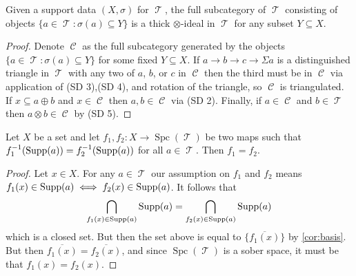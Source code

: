 \documentclass[11pt]{article}
\DeclareMathOperator{\CC}{\mathcal{C}}
\DeclareMathOperator{\TT}{\mathcal{T}}
\DeclareMathOperator{\spc}{Spc}
\begin{document}
\begin{lem}\label{lem:support-ideal}
Given a support data $(X,\sigma)$ for $\TT$, the full subcategory of $\TT$ consisting of objects $\{a \in \TT: \sigma(a) \subseteq Y\}$ is a thick $\otimes$-ideal in $\TT$ for any subset $Y \subseteq X$.
\end{lem}
\begin{proof}
Denote $\CC$ as the full subcategory generated by the objects $\{a \in \TT: \sigma(a) \subseteq Y\}$ for some fixed $Y \subseteq X$. If $a \xrightarrow{} b \xrightarrow{} c \xrightarrow{} \Sigma a $ is a distinguished triangle in $\TT$ with any two of $a$, $b$, or $c$ in $\CC$ then the third must be in $\CC$ via application of (SD 3),(SD 4), and rotation of the triangle, so $\CC$ is triangulated. If $x \subseteq a \oplus b$ and $x \in \CC$ then $a,b \in \CC$ via (SD 2). Finally, if $a \in \CC$ and $b \in \TT$ then $a \otimes b \in \CC$ by (SD 5). 
\end{proof}

\begin{lem}\label{lem:sober-support}
Let $X$ be a set and let $f_1,f_2: X \to \spc(\TT)$ be two maps such that $f_1^{-1}(\operatorname{Supp}(a)) = f_{2}^{-1}(\operatorname{Supp}(a))$ for all $a \in \TT$. Then $f_1 = f_2$.
\end{lem}
\begin{proof}
Let $x \in X$. For any $a \in \TT$ our assumption on $f_1$ and $f_2$ means $f_1(x) \in \operatorname{Supp}(a) \iff f_2(x) \in \operatorname{Supp}(a)$. It follows that 
\[
	\bigcap_{f_1(x) \in \operatorname{Supp}(a)}\operatorname{Supp}(a) = \bigcap_{f_2(x) \in \operatorname{Supp}(a)}\operatorname{Supp}(a)
\]
which is a closed set. But then the set above is equal to $\overline{\{f_1(x)\}}$ by \autoref{cor:basis}. But then $\overline{f_1(x)} = \overline{f_{2}(x)}$, and since $\spc(\TT)$ is a sober space, it must be that $f_1(x) = f_2(x)$.
\end{proof}
\end{document}
